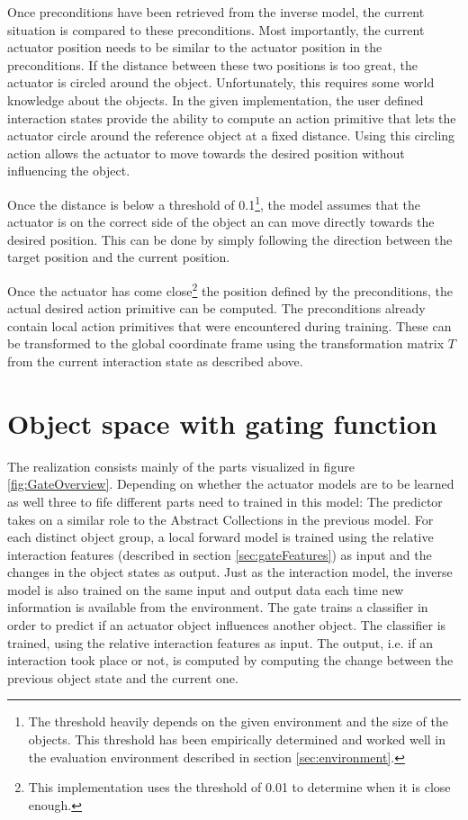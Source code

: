 Once preconditions have been retrieved from the inverse model, the current situation is compared to these preconditions. Most importantly, the current actuator position needs to be similar to the actuator position in the preconditions. If the distance between these two positions is too great, the actuator is circled around the object. Unfortunately, this requires some world knowledge about the objects. In the given implementation, the user defined interaction states provide the ability to compute an action primitive that lets the actuator circle around the reference object at a fixed distance. %
Using this circling action allows the actuator to move towards the desired position without influencing the object.

Once the distance is below a threshold of 0.1\footnote{The threshold heavily depends on the given environment and the size of the objects. This threshold has been empirically determined and worked well in the evaluation environment described in section \ref{sec:environment}.}, the model assumes that the actuator is on the correct side of the object an can move directly towards the desired position. This can be done by simply following the direction between the target position and the current position.

Once the actuator has come close\footnote{This implementation uses the threshold of 0.01 to determine when it is close enough.} the position defined by the preconditions, the actual desired action primitive can be computed. The preconditions already contain local action primitives that were encountered during training. These can be transformed to the global coordinate frame using the transformation matrix $T$ from the current interaction state as described above. 

\section{Object space with gating function \label{sec:gateRealization}}

The realization consists mainly of the parts visualized in figure \ref{fig:GateOverview}. Depending on whether the actuator models are to be learned as well three to fife different parts need to trained in this model: The predictor takes on a similar role to the Abstract Collections in the previous model. For each distinct object group, a local forward model is trained using the relative interaction features (described in section \ref{sec:gateFeatures}) as input and the changes in the object states as output. Just as the interaction model, the inverse model is also trained on the same input and output data each time new information is available from the environment. 
The gate trains a classifier in order to predict if an actuator object influences another object. The classifier is trained, using the relative interaction features as input. The output, i.e. if an interaction took place or not, is computed by computing the change between the previous object state and the current one.

